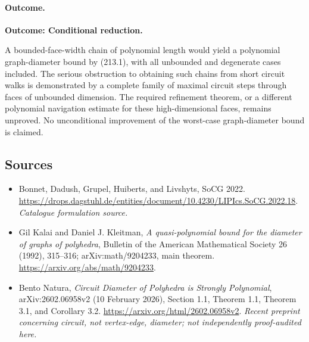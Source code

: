 \documentclass[11pt,a4paper]{article}
\begin{document}
\paragraph{Outcome.}
\textbf{Outcome: Conditional reduction.}

A bounded-face-width chain of polynomial length would yield a polynomial
graph-diameter bound by (213.1), with all unbounded and degenerate cases
included. The serious obstruction to obtaining such chains from short
circuit walks is demonstrated by a complete family of maximal circuit steps
through faces of unbounded dimension. The required refinement theorem, or
a different polynomial navigation estimate for these high-dimensional
faces, remains unproved. No unconditional improvement of the worst-case
graph-diameter bound is claimed.
\subsection{Sources}
\begin{itemize}\raggedright
\item[\textnormal{[S1]}]\hypertarget{source:30001930:1}{} Bonnet, Dadush, Grupel, Huiberts, and Livshyts, SoCG 2022.
\url{https://drops.dagstuhl.de/entities/document/10.4230/LIPIcs.SoCG.2022.18}.
{\small\textit{Catalogue formulation source.}}
\item[\textnormal{[E1]}]\hypertarget{extra:30001930:1}{} Gil Kalai and Daniel J. Kleitman,
\emph{A quasi-polynomial bound for the diameter of graphs of polyhedra},
Bulletin of the American Mathematical Society 26 (1992), 315--316;
arXiv:math/9204233, main theorem.
\url{https://arxiv.org/abs/math/9204233}.
\item[\textnormal{[E2]}]\hypertarget{extra:30001930:2}{} Bento Natura,
\emph{Circuit Diameter of Polyhedra is Strongly Polynomial},
arXiv:2602.06958v2 (10 February 2026), Section 1.1, Theorem 1.1,
Theorem 3.1, and Corollary 3.2.
\url{https://arxiv.org/html/2602.06958v2}.
{\small\textit{Recent preprint concerning circuit, not vertex-edge, diameter; not independently proof-audited here.}}
\end{itemize}
\end{document}
